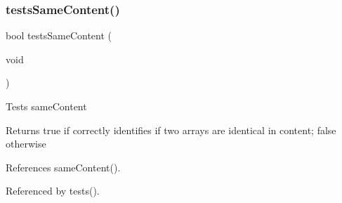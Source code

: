 \mbox{\label{tests_8h_ae10560611501773128dce8c1a36e3e84}} 
\subsubsection{tests\+Same\+Content()}
{\footnotesize\ttfamily bool tests\+Same\+Content (\begin{DoxyParamCaption}\item[{void}]{ }\end{DoxyParamCaption})}

Tests same\+Content \begin{DoxyReturn}{Returns}
true if correctly identifies if two arrays are identical in content; false otherwise 
\end{DoxyReturn}


References same\+Content().



Referenced by tests().

